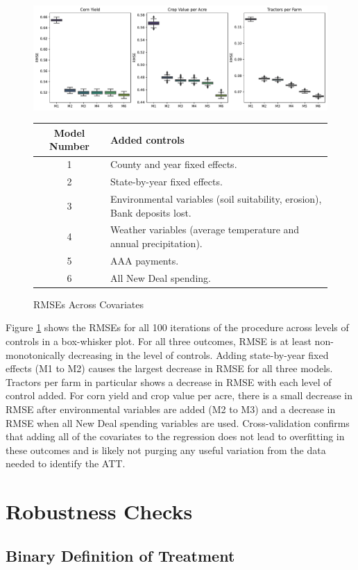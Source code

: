 \documentclass[12pt]{article}
\begin{document}
\begin{appendices}
\begin{figure}
\caption{RMSEs Across Covariates}
\label{rmses}
\includegraphics[width=\textwidth]{Model_RMSEs.pdf}
\centering
\begin{tabular}{cl}
Model Number & Added controls \\ \hline 
1  & County and year fixed effects.\\
2  & State-by-year fixed effects. \\
3  & Environmental variables (soil suitability, erosion), Bank deposits lost. \\
4  & Weather variables (average temperature and annual precipitation). \\
5  & AAA payments. \\
6  & All New Deal spending.     
\end{tabular}
\end{figure}

Figure \ref{rmses} shows the RMSEs for all 100 iterations of the procedure across levels of controls in a box-whisker plot.
For all three outcomes, RMSE is at least non-monotonically decreasing in the level of controls.
Adding state-by-year fixed effects (M1 to M2) causes the largest decrease in RMSE for all three models. 
Tractors per farm in particular shows a decrease in RMSE with each level of control added.
For corn yield and crop value per acre, there is a small decrease in RMSE after environmental variables are added (M2 to M3) and a decrease in RMSE when all New Deal spending variables are used.
Cross-validation confirms that adding all of the covariates to the regression does not lead to overfitting in these outcomes and is likely not purging any useful variation from the data needed to identify the ATT.
\setcounter{table}{0}
\setcounter{figure}{0}
\renewcommand{\thetable}{\Alph{section}\arabic{table}}


\section{Robustness Checks}
\subsection{Binary Definition of Treatment}
\label{appendix_binary}


\end{appendices}
\end{document}
